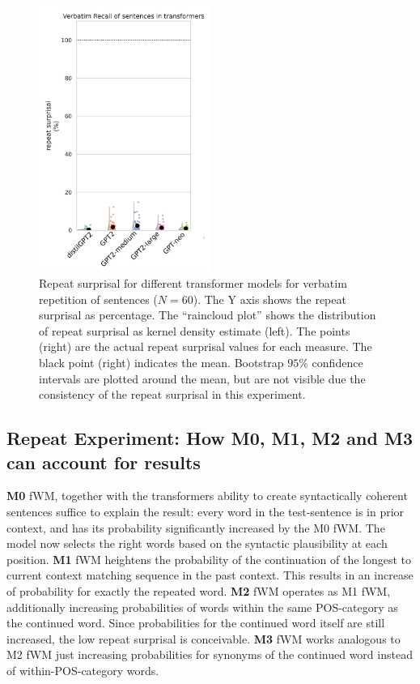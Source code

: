 \begin{figure}[H]
    \centering
    \includegraphics[width=0.5\textwidth]{experiments/repeat_surprisal_all.pdf}
    \caption{Repeat surprisal for different transformer models for verbatim repetition of sentences ($N = 60$). The Y axis shows the repeat surprisal as percentage. The ``raincloud plot'' \parencite{allen_raincloud_2019} shows the distribution of repeat surprisal as kernel density estimate (left). The points (right) are the actual repeat surprisal values for each measure. The black point (right) indicates the mean. Bootstrap $95\%$ confidence intervals are plotted around the mean, but are not visible due the consistency of the repeat surprisal in this experiment.}
    \label{fig:repeat_all}
\end{figure}


\subsection{Repeat Experiment: How M0, M1, M2 and M3 can account for results} \label{app:repeat_null_explanation}

\textbf{M0} fWM, together with the transformers ability to create syntactically coherent sentences suffice to explain the result: every word in the test-sentence is in prior context, and has its probability significantly increased by the M0 fWM. The model now selects the right words based on the syntactic plausibility at each position.
\textbf{M1} fWM heightens the probability of the continuation of the longest to current context matching sequence in the past context.
This results in an increase of probability for exactly the repeated word.
\textbf{M2} fWM operates as M1 fWM, additionally increasing probabilities of words within the same POS-category as the continued word.
Since probabilities for the continued word itself are still increased, the low repeat surprisal is conceivable.
\textbf{M3} fWM works analogous to M2 fWM just increasing probabilities for synonyms of the continued word instead of within-POS-category words.


